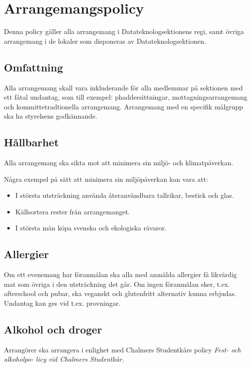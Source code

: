 \section{Arrangemangspolicy}
Denna policy gäller alla arrangemang i Datateknologsektionens regi, samt övriga arrangemang i de lokaler som disponeras av Datateknologsektionen.

\subsection{Omfattning}
Alla arrangemang skall vara inkluderande för alla medlemmar på sektionen med ett fåtal undantag, som till exempel: phaddersittningar, mottagningsarrangemang och kommittetradtionella arrangemang. Arrangemang med en specifik målgrupp ska ha styrelsens godkännande.

\subsection{Hållbarhet}
Alla arrangemang ska sikta mot att minimera sin miljö- och klimatpåverkan.

Några exempel på sätt att minimera sin miljöpåverkan kan vara att:
\begin{itemize}
    \item I största utsträckning använda återanvändbara tallrikar, bestick och glas.
    \item Källsortera rester från arrangemanget.
    \item I största mån köpa svenska och ekologiska råvaror.
\end{itemize}

\subsection{Allergier}
Om ett evenemang har föranmälan ska alla med anmälda allergier få likvärdig mat som övriga i den utsträckning det går. Om ingen föranmälan sker, t.ex. afterschool och pubar, ska veganskt och glutenfritt alternativ kunna erbjudas. Undantag kan ges vid t.ex. provningar.

\subsection{Alkohol och droger}
Arrangörer ska arrangera i enlighet med Chalmers Studentkårs policy \textit{Fest- och alkoholpo-
licy vid Chalmers Studentkår.}